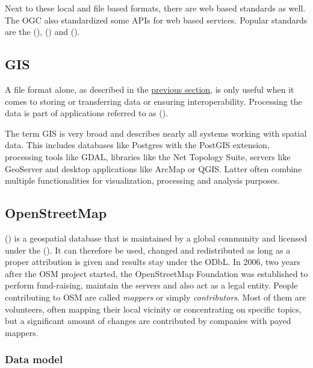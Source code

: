 			Next to these local and file based formats, there are web based standards as well.
			The OGC also standardized some APIs for web based services.
			Popular standards are the  (),  () and  ().
	
	\subsection{GIS}
	
		A file format alone, as described in the \hyperref[subsec:file-formats]{previous section}, is only useful when it comes to storing or transferring data or ensuring interoperability.
		Processing the data is part of applications referred to as  ().
		
		The term GIS is very broad and describes nearly all systems working with spatial data.
		This includes databases like Postgres with the PostGIS extension, processing tools like GDAL, libraries like the Net Topology Suite, servers like GeoServer and desktop applications like ArcMap or QGIS.
		Latter often combine multiple functionalities for visualization, processing and analysis purposes.
	
	\subsection{OpenStreetMap}
	\label{subsec:osm}
	
		 () is a geospatial database that is maintained by a global community and licensed under the  ()\cite{osm-wiki-about}.
		It can therefore be used, changed and redistributed as long as a proper attribution is given and results stay under the ODbL\cite{odbl-summary}.
		In 2006, two years after the OSM project started, the OpenStreetMap Foundation was established to perform fund-raising, maintain the servers and also act as a legal entity.
		People contributing to OSM are called \textit{mappers} or simply \textit{contributors}.
		Most of them are volunteers, often mapping their local vicinity or concentrating on specific topics, but a significant amount of changes are contributed by companies with payed mappers\cite{osm-corporate-mappers}.
		
		\subsubsection{Data model}
		
